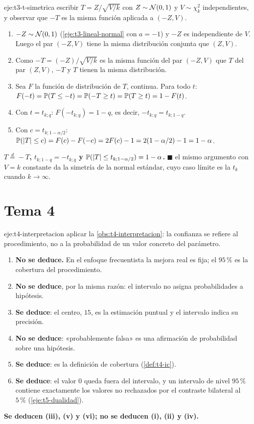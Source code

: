 \begin{solucion}{eje:t3-t-simetrica}
\planteamiento escribir $T=Z/\sqrt{V/k}$ con $Z\sim\mathcal{N}(0,1)$ y $V\sim\chi^{2}_k$ independientes, y observar que $-T$ es la misma función aplicada a $(-Z,V)$.
\pasos
\begin{enumerate}[label=\arabic*.]
  \item $-Z\sim\mathcal{N}(0,1)$ (\cref{eje:t3-lineal-normal} con $a=-1$) y $-Z$ es independiente de $V$. Luego el par $(-Z,V)$ tiene la misma distribución conjunta que $(Z,V)$.
  \item Como $-T=(-Z)/\sqrt{V/k}$ es la misma función del par $(-Z,V)$ que $T$ del par $(Z,V)$, $-T$ y $T$ tienen la misma distribución.
  \item Sea $F$ la función de distribución de $T$, continua. Para todo $t$: $F(-t)=\mathbb{P}(T\le-t)=\mathbb{P}(-T\ge t)=\mathbb{P}(T\ge t)=1-F(t)$.
  \item Con $t=t_{k;q}$: $F(-t_{k;q})=1-q$, es decir, $-t_{k;q}=t_{k;1-q}$.
  \item Con $c=t_{k;1-\alpha/2}$: $\mathbb{P}(\lvert T\rvert\le c)=F(c)-F(-c)=2F(c)-1=2(1-\alpha/2)-1=1-\alpha$.
\end{enumerate}
\resultado \textbf{$T\stackrel{d}{=}-T$, $t_{k;1-q}=-t_{k;q}$ y $\mathbb{P}(\lvert T\rvert\le t_{k;1-\alpha/2})=1-\alpha$.} $\blacksquare$
\comprobacion el mismo argumento con $V=k$ constante da la simetría de la normal estándar, cuyo caso límite es la $t_k$ cuando $k\to\infty$.
\end{solucion}

\section{Tema 4}

\begin{solucion}{eje:t4-interpretacion}
\planteamiento aplicar la \cref{obs:t4-interpretacion}: la confianza se refiere al procedimiento, no a la probabilidad de un valor concreto del parámetro.
\pasos
\begin{enumerate}[label=(\roman*)]
  \item \textbf{No se deduce.} En el enfoque frecuentista la mejora real es fija; el $95\,\%$ es la cobertura del procedimiento.
  \item \textbf{No se deduce}, por la misma razón: el intervalo no asigna probabilidades a hipótesis.
  \item \textbf{Se deduce}: el centro, $15$, es la estimación puntual y el intervalo indica su precisión.
  \item \textbf{No se deduce}: «probablemente falsa» es una afirmación de probabilidad sobre una hipótesis.
  \item \textbf{Se deduce}: es la definición de cobertura (\cref{def:t4-ic}).
  \item \textbf{Se deduce}: el valor $0$ queda fuera del intervalo, y un intervalo de nivel $95\,\%$ contiene exactamente los valores no rechazados por el contraste bilateral al $5\,\%$ (\cref{eje:t5-dualidad}).
\end{enumerate}
\resultado \textbf{Se deducen (iii), (v) y (vi); no se deducen (i), (ii) y (iv).}
\end{solucion}

